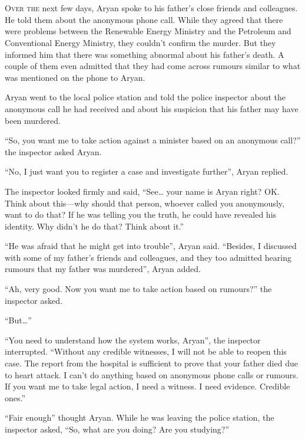 \chapter{}

\lettrine{O}{ver the} next few days, Aryan spoke to his father's close friends and
colleagues. He told them about the anonymous phone call. While they agreed that
there were problems between the Renewable Energy Ministry and the
Petroleum and Conventional Energy Ministry, they couldn't confirm the murder. But
they informed him that there was something abnormal about his father's death. A
couple of them even admitted that they had come across rumours similar to what
was mentioned on the phone to Aryan.

Aryan went to the local police station and told the police inspector about the
anonymous call he had received and about his suspicion that his father may have been
murdered.

“So, you want me to take action against a minister based on an anonymous call?”
the inspector asked Aryan.

“No, I just want you to register a case and investigate further”, Aryan replied.

The inspector looked firmly and said, “See… your name is Aryan right? OK.
Think about this—why should that person, whoever called you anonymously, want
to do that? If he was telling you the truth, he could have revealed his
identity. Why didn't he do that? Think about it.”

“He was afraid that he might get into trouble”, Aryan said. “Besides, I
discussed with some of my father's friends and colleagues, and they too admitted
hearing rumours that my father was murdered”, Aryan added.

“Ah, very good. Now you want me to take action based on rumours?” the inspector
asked.

“But…”

“You need to understand how the system works, Aryan”, the inspector interrupted.
“Without any credible witnesses, I will not be able to reopen this case. The
report from the hospital is sufficient to prove that your father died due to
heart attack. I can't do anything based on anonymous phone calls or rumours. If
you want me to take legal action, I need a witness. I need evidence. Credible
ones.”

“Fair enough” thought Aryan. While he was leaving the police station, the
inspector asked, “So, what are you doing? Are you studying?”

